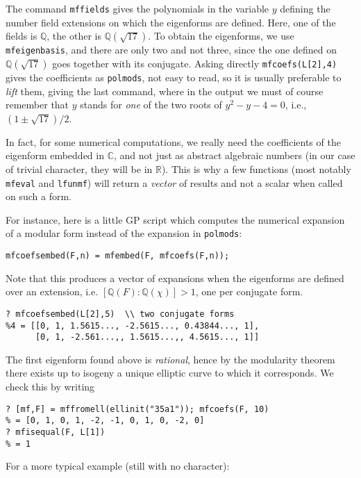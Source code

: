 \documentclass[11pt]{article}
\newcommand{\Q}{{\mathbb Q}}
\newcommand{\R}{{\mathbb R}}
\newcommand{\C}{{\mathbb C}}
\def\kbd#1{{\tt #1}}
\begin{document}
The command \kbd{mffields} gives the polynomials in the variable $y$ defining
the number field extensions on which the eigenforms are defined. Here, one of
the fields is $\Q$, the other is $\Q(\sqrt{17})$. To obtain the eigenforms,
we use \kbd{mfeigenbasis}, and there are only two and not three, since the
one defined on $\Q(\sqrt{17})$ goes together with its conjugate. Asking
directly \kbd{mfcoefs(L[2],4)} gives the coefficients as \kbd{polmods}, not
easy to read, so it is usually preferable to \emph{lift} them, giving the
last command, where in the output we must of course remember that $y$ stands
for \emph{one} of the two roots of $y^2-y-4=0$, i.e., $(1\pm\sqrt{17})/2$.

In fact, for some numerical computations, we really need the
coefficients of the eigenform embedded in $\C$, and not just as abstract
algebraic numbers (in our case of trivial character, they will be in $\R$).
This is why a few functions (most notably \kbd{mfeval} and \kbd{lfunmf})
will return a \emph{vector} of results and not a scalar when called on such
a form.

For instance, here is a little GP script which computes the numerical
expansion of a modular form instead of the expansion in \kbd{polmods}:

\begin{verbatim}
mfcoefsembed(F,n) = mfembed(F, mfcoefs(F,n));
\end{verbatim}

Note that this produces a vector of expansions when the eigenforms
are defined over an extension, i.e. $[\Q(F):\Q(\chi)] > 1$, one per conjugate
form.
\begin{verbatim}
? mfcoefsembed(L[2],5)  \\ two conjugate forms
%4 = [[0, 1, 1.5615..., -2.5615..., 0.43844..., 1],
      [0, 1, -2.561...,, 1.5615...,, 4.5615..., 1]]
\end{verbatim}

The first eigenform found above is \emph{rational}, hence by the modularity
theorem there exists up to isogeny a unique elliptic curve to which it
corresponds. We check this by writing

\begin{verbatim}
? [mf,F] = mffromell(ellinit("35a1")); mfcoefs(F, 10)
% = [0, 1, 0, 1, -2, -1, 0, 1, 0, -2, 0]
? mfisequal(F, L[1])
% = 1
\end{verbatim}

For a more typical example (still with no character):
\end{document}
